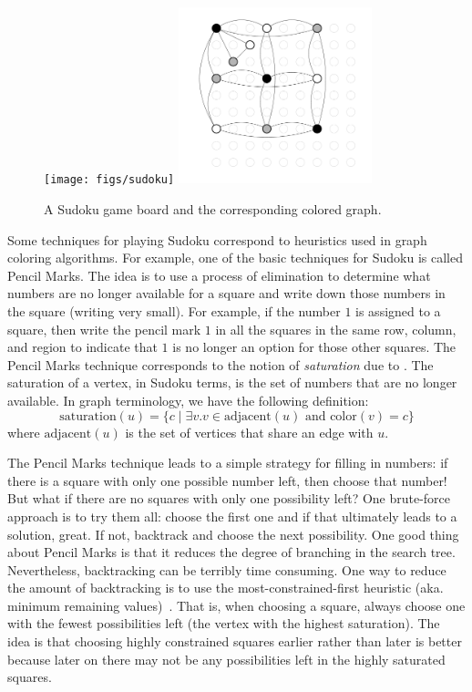 \documentclass[7x10]{TimesAPriori_MIT}%
\begin{document}
\begin{figure}[tbp]
\texttt{[image: figs/sudoku]}
\includegraphics[width=0.5\textwidth]{figs/sudoku-graph-bw}
\caption{A Sudoku game board and the corresponding colored graph.}
\label{fig:sudoku-graph}
\end{figure}

Some techniques for playing Sudoku correspond to heuristics used in
graph coloring algorithms.  For example, one of the basic techniques
for Sudoku is called Pencil Marks. The idea is to use a process of
elimination to determine what numbers are no longer available for a
square and write down those numbers in the square (writing very
small). For example, if the number $1$ is assigned to a square, then
write the pencil mark $1$ in all the squares in the same row, column,
and region to indicate that $1$ is no longer an option for those other
squares.
%
The Pencil Marks technique corresponds to the notion of
\emph{saturation} due to \cite{Brelaz:1979eu}.  The
saturation of a vertex, in Sudoku terms, is the set of numbers that
are no longer available. In graph terminology, we have the following
definition:
\begin{equation*}
  \mathrm{saturation}(u) = \{ c \;|\; \exists v. v \in \mathrm{adjacent}(u)
     \text{ and } \mathrm{color}(v) = c \}
\end{equation*}
where $\mathrm{adjacent}(u)$ is the set of vertices that share an
edge with $u$.

The Pencil Marks technique leads to a simple strategy for filling in
numbers: if there is a square with only one possible number left, then
choose that number! But what if there are no squares with only one
possibility left? One brute-force approach is to try them all: choose
the first one and if that ultimately leads to a solution, great.  If
not, backtrack and choose the next possibility.  One good thing about
Pencil Marks is that it reduces the degree of branching in the search
tree. Nevertheless, backtracking can be terribly time consuming. One
way to reduce the amount of backtracking is to use the
most-constrained-first heuristic (aka. minimum remaining
values)~\citep{Russell2003}.  That is, when choosing a square, always
choose one with the fewest possibilities left (the vertex with the
highest saturation).  The idea is that choosing highly constrained
squares earlier rather than later is better because later on there may
not be any possibilities left in the highly saturated squares.
\end{document}

